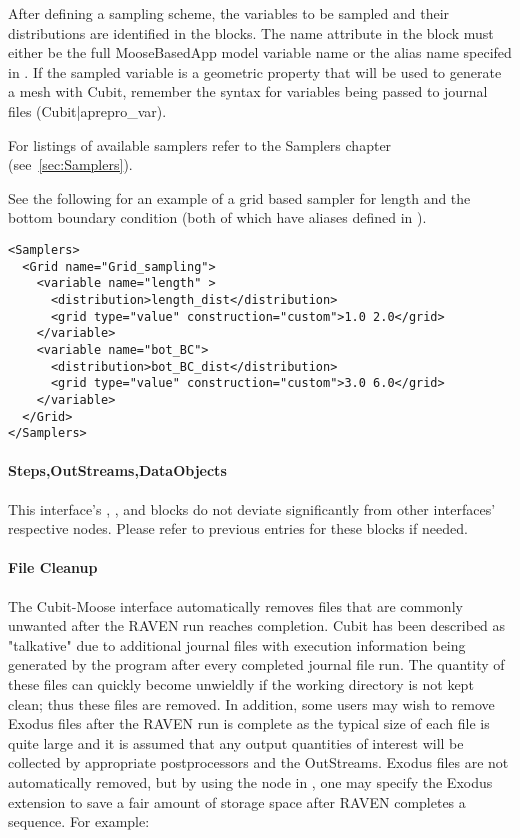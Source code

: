 After defining a sampling scheme, the variables to be sampled and
their distributions are identified in the  blocks.
The name attribute in the  block must either be the
full MooseBasedApp model variable name or the alias name specifed in
.  If the sampled variable is a geometric property
that will be used to generate a mesh with Cubit, remember the syntax for
variables being passed to journal files (Cubit|aprepro\_var).

For listings of available samplers
refer to the Samplers chapter (see~\ref{sec:Samplers}).

See the following for an example of a grid based sampler for
length and the bottom boundary condition (both of which have aliases
defined in ).

\begin{lstlisting}[style=XML]
<Samplers>
  <Grid name="Grid_sampling">
    <variable name="length" >
      <distribution>length_dist</distribution>
      <grid type="value" construction="custom">1.0 2.0</grid>
    </variable>
    <variable name="bot_BC">
      <distribution>bot_BC_dist</distribution>
      <grid type="value" construction="custom">3.0 6.0</grid>
    </variable>
  </Grid>
</Samplers>
\end{lstlisting}

\paragraph{Steps,OutStreams,DataObjects}
This interface's , , and
 blocks do not deviate significantly from
other interfaces' respective nodes.  Please refer to previous
entries for these blocks if needed.

\paragraph{File Cleanup}
The Cubit-Moose interface automatically removes files that are commonly
unwanted after the RAVEN run reaches completion. Cubit has been described as
"talkative" due to additional journal files with execution information
being generated by the program after every completed journal file run.
The quantity of these files can quickly become unwieldly if the working
directory is not kept clean; thus these files are removed.  In addition, some users
may wish to remove Exodus files after the RAVEN run is complete as
the typical size of each file is quite large and it is assumed that any
output quantities of interest will be collected by appropriate postprocessors
and the OutStreams.  Exodus files are not automatically removed,
but by using the  node in , one
may specify the Exodus extension to save a fair amount of storage space
after RAVEN completes a sequence. For example:

